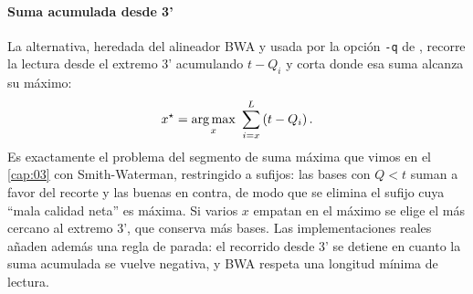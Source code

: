 \begin{simbolos}
\end{simbolos}

\paragraph{Suma acumulada desde 3'} La alternativa, heredada del alineador BWA y usada por la opción \texttt{-q} de , recorre la lectura desde el extremo 3' acumulando $t-Q_i$ y corta donde esa suma alcanza su máximo:
\begin{equation}\label{eq:06-bwa}
x^{\star} = \operatorname*{arg\,max}_{x}\ \sum_{i=x}^{L}\left(t - Q_i\right).
\end{equation}
Es exactamente el problema del segmento de suma máxima que vimos en el \cref{cap:03} con Smith-Waterman, restringido a sufijos: las bases con $Q<t$ suman a favor del recorte y las buenas en contra, de modo que se elimina el sufijo cuya ``mala calidad neta'' es máxima. Si varios $x$ empatan en el máximo se elige el más cercano al extremo 3', que conserva más bases. Las implementaciones reales añaden además una regla de parada: el recorrido desde 3' se detiene en cuanto la suma acumulada se vuelve negativa, y BWA respeta una longitud mínima de lectura.

